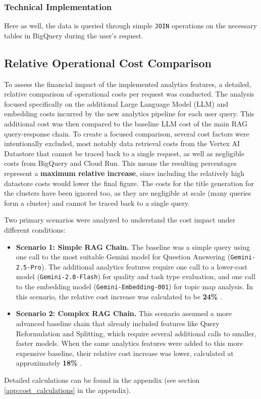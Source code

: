 \documentclass[
	english,
	ruledheaders=section,%
	class=report,%
	thesis={type=bachelor},%
	accentcolor=1b,%
	custommargins=true,%
	marginpar=false,%
	parskip=half-,%
	fontsize=11pt,%
	DIV=14,
]{tudapub}
\begin{document}
\subsubsection{Technical Implementation}
Here as well, the data is queried through simple \texttt{JOIN} operations on the necessary tables in BigQuery during the user's request.

\subsection{Relative Operational Cost Comparison}
To assess the financial impact of the implemented analytics features, a detailed, relative comparison of operational costs per request was conducted. The analysis focused specifically on the additional Large Language Model (LLM) and embedding costs incurred by the new analytics pipeline for each user query. This additional cost was then compared to the baseline LLM cost of the main RAG query-response chain. To create a focused comparison, several cost factors were intentionally excluded, most notably data retrieval costs from the Vertex AI Datastore that cannot be traced back to a single request, as well as negligible costs from BigQuery and Cloud Run. This means the resulting percentages represent a \textbf{maximum relative increase}, since including the relatively high datastore costs would lower the final figure. The costs for the title generation for the clusters have been ignored too, as they are negligible at scale (many queries form a cluster) and cannot be traced back to a single query.

Two primary scenarios were analyzed to understand the cost impact under different conditions:

\begin{itemize}
    \item \textbf{Scenario 1: Simple RAG Chain.} The baseline was a simple query using one call to the most suitable Gemini model for Question Answering (\texttt{Gemini-2.5-Pro}). The additional analytics features require one call to a lower-cost model (\texttt{Gemini-2.0-Flash}) for quality and task type evaluation, and one call to the embedding model (\texttt{Gemini-Embedding-001}) for topic map analysis. In this scenario, the relative cost increase was calculated to be \textbf{24\%} \parencite{GoogleGeminiPricing}.

    \item \textbf{Scenario 2: Complex RAG Chain.} This scenario assumed a more advanced baseline chain that already included features like Query Reformulation and Splitting, which require several additional calls to smaller, faster models. When the same analytics features were added to this more expensive baseline, their relative cost increase was lower, calculated at approximately \textbf{18\%} \parencite{GoogleGeminiPricing}.
\end{itemize}
Detailed calculations can be found in the appendix (see section \ref{app:cost_calculations} in the appendix).
\end{document}
